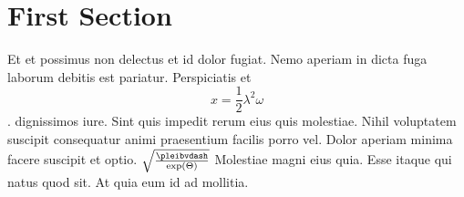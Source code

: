 \documentclass{scrbook}
\begin{document}
	\section{First Section}
		Et et possimus non delectus et id dolor fugiat. Nemo aperiam in
		dicta fuga laborum debitis est pariatur.  Perspiciatis et
		\begin{equation}
		    x = \frac{1}{2} \lambda^2 \omega
		\end{equation}.
		dignissimos iure. Sint quis impedit rerum eius quis molestiae.
		Nihil voluptatem suscipit consequatur animi praesentium facilis
		porro vel. Dolor aperiam minima facere suscipit et optio.
		$\sqrt{\frac{\pleibvdash}{\exp(\Theta)}}$
		Molestiae magni eius quia. Esse itaque qui natus quod sit. At
		quia eum id ad mollitia.
\end{document}

